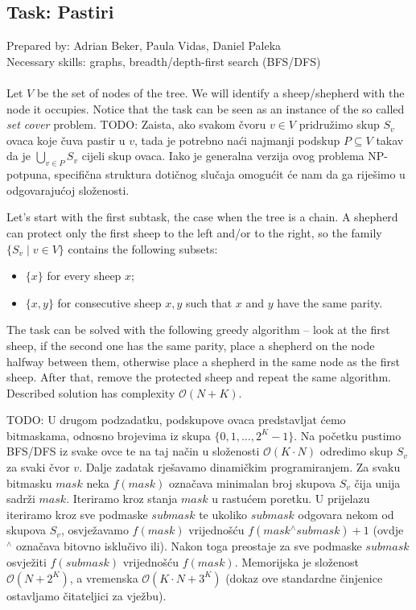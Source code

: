 \subsection*{Task: Pastiri}
\textsf{Prepared by: Adrian Beker, Paula Vidas, Daniel Paleka}\\
\textsf{Necessary skills: graphs, breadth/depth-first search (BFS/DFS)}
\\\\

Let $V$ be the set of nodes of the tree. We will identify a sheep/shepherd with
the node it occupies. Notice that the task can be seen as an instance of the so
called \textit{set cover} problem.
TODO: Zaista, ako
svakom čvoru $v \in V$ pridružimo skup $S_v$ ovaca koje čuva pastir u $v$, tada
je potrebno naći najmanji podskup $P \subseteq V$ takav da je $\bigcup_{v \in
P} S_v$ cijeli skup ovaca. Iako je generalna verzija ovog problema NP-potpuna,
specifična struktura dotičnog slučaja omogućit će nam da ga riješimo u
odgovarajućoj složenosti.

Let's start with the first subtask, the case when the tree is a chain. A
shepherd can protect only the first sheep to the left and/or to the right, so
the family $\{S_v \mid v \in V\}$ contains the following subsets:
\begin{itemize}
    \item $\{x\}$ for every sheep $x$;
    \item $\{x, y\}$ for consecutive sheep $x, y$ such that $x$ and $y$ have the
        same parity.
\end{itemize}
The task can be solved with the following greedy algorithm -- look at the first
sheep, if the second one has the same parity, place a shepherd on the node
halfway between them, otherwise place a shepherd in the same node as the first
sheep. After that, remove the protected sheep and repeat the same algorithm.
Described solution has complexity $\mathcal{O}(N + K)$.

TODO:
U drugom podzadatku, podskupove ovaca predstavljat ćemo bitmaskama, odnosno
brojevima iz skupa $\{0, 1, \ldots, 2^K-1\}$. Na početku pustimo BFS/DFS iz
svake ovce te na taj način u složenosti $\mathcal{O}(K \cdot N)$ odredimo skup
$S_v$ za svaki čvor $v$. Dalje zadatak rješavamo dinamičkim programiranjem. Za
svaku bitmasku $mask$ neka $f(mask)$ označava minimalan broj skupova $S_v$ čija
unija sadrži $mask$. Iteriramo kroz stanja $mask$ u rastućem poretku. U
prijelazu iteriramo kroz sve podmaske $submask$ te ukoliko $submask$ odgovara
nekom od skupova $S_v$, osvježavamo $f(mask)$ vrijednošću $f(mask
\mathbin{^\wedge} submask) + 1$ (ovdje $^\wedge$ označava bitovno isklučivo
ili). Nakon toga preostaje za sve podmaske $submask$ osvježiti $f(submask)$
vrijednošću $f(mask)$. Memorijska je složenost $\mathcal{O}(N + 2^K)$, a
vremenska $\mathcal{O}(K \cdot N + 3^K)$ (dokaz ove standardne činjenice
ostavljamo čitateljici za vježbu).

